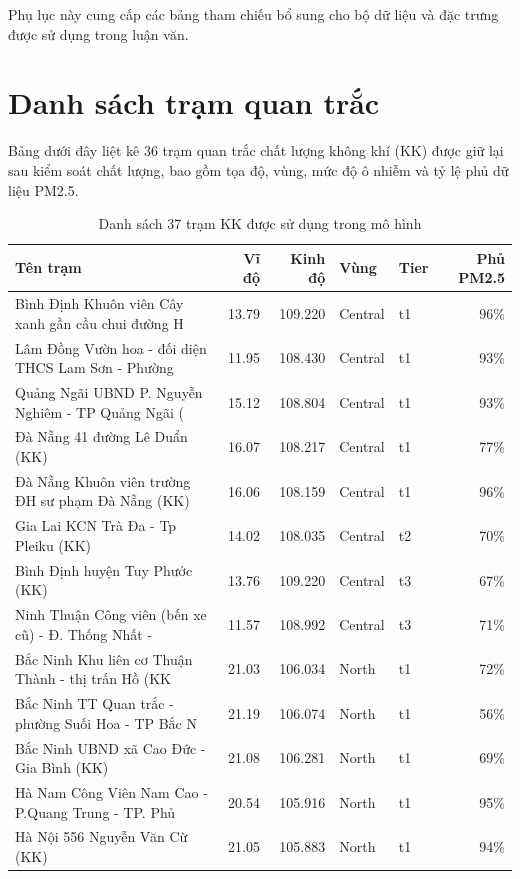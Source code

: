 \documentclass[../DoAn.tex]{subfiles}
\begin{document}
Phụ lục này cung cấp các bảng tham chiếu bổ sung cho bộ dữ liệu và đặc trưng được sử dụng trong luận văn.

\section{Danh sách trạm quan trắc}

Bảng dưới đây liệt kê 36 trạm quan trắc chất lượng không khí (KK) được giữ lại sau kiểm soát chất lượng, bao gồm tọa độ, vùng, mức độ ô nhiễm và tỷ lệ phủ dữ liệu PM2.5.

{\small
\begin{longtable}{p{5.5cm}rrllr}
\caption{Danh sách 37 trạm KK được sử dụng trong mô hình}\\
\toprule
\textbf{Tên trạm} & \textbf{Vĩ độ} & \textbf{Kinh độ} & \textbf{Vùng} & \textbf{Tier} & \textbf{Phủ PM2.5} \\
\midrule\endhead
  Bình Định Khuôn viên Cây xanh gần cầu chui đường H & 13.79 & 109.220 & Central & t1 & 96\% \\
  Lâm Đồng Vườn hoa - đối diện THCS Lam Sơn - Phường & 11.95 & 108.430 & Central & t1 & 93\% \\
  Quảng Ngãi UBND P. Nguyễn Nghiêm - TP Quảng Ngãi ( & 15.12 & 108.804 & Central & t1 & 93\% \\
  Đà Nẵng 41 đường Lê Duẩn (KK) & 16.07 & 108.217 & Central & t1 & 77\% \\
  Đà Nẵng Khuôn viên trường ĐH sư phạm Đà Nẵng (KK) & 16.06 & 108.159 & Central & t1 & 96\% \\
  Gia Lai KCN Trà Đa - Tp Pleiku (KK) & 14.02 & 108.035 & Central & t2 & 70\% \\
  Bình Định huyện Tuy Phước (KK) & 13.76 & 109.220 & Central & t3 & 67\% \\
  Ninh Thuận Công viên (bến xe cũ) - Đ. Thống Nhất - & 11.57 & 108.992 & Central & t3 & 71\% \\
  Bắc Ninh Khu liên cơ Thuận Thành - thị trấn Hồ (KK & 21.03 & 106.034 & North & t1 & 72\% \\
  Bắc Ninh TT Quan trắc - phường Suối Hoa - TP Bắc N & 21.19 & 106.074 & North & t1 & 56\% \\
  Bắc Ninh UBND xã Cao Đức - Gia Bình (KK) & 21.08 & 106.281 & North & t1 & 69\% \\
  Hà Nam Công Viên Nam Cao - P.Quang Trung - TP. Phủ & 20.54 & 105.916 & North & t1 & 95\% \\
  Hà Nội 556 Nguyễn Văn Cừ (KK) & 21.05 & 105.883 & North & t1 & 94\% \\

\end{longtable}}
\end{document}
